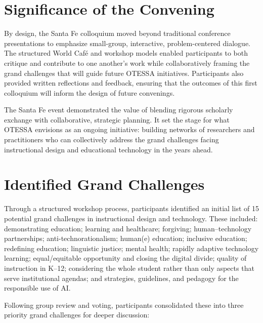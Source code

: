 \documentclass[
  letterpaper,
  DIV=11,
  numbers=noendperiod]{scrartcl}
\begin{document}
\section{Significance of the
Convening}\label{significance-of-the-convening}

By design, the Santa Fe colloquium moved beyond traditional conference
presentations to emphasize small-group, interactive, problem-centered
dialogue. The structured World Café and workshop models enabled
participants to both critique and contribute to one another's work while
collaboratively framing the grand challenges that will guide future
OTESSA initiatives. Participants also provided written reflections and
feedback, ensuring that the outcomes of this first colloquium will
inform the design of future convenings.

The Santa Fe event demonstrated the value of blending rigorous scholarly
exchange with collaborative, strategic planning. It set the stage for
what OTESSA envisions as an ongoing initiative: building networks of
researchers and practitioners who can collectively address the grand
challenges facing instructional design and educational technology in the
years ahead.

\section{Identified Grand Challenges}\label{identified-grand-challenges}

Through a structured workshop process, participants identified an
initial list of 15 potential grand challenges in instructional design
and technology. These included: demonstrating education; learning and
healthcare; forgiving; human--technology partnerships;
anti-technorationalism; human(e) education; inclusive education;
redefining education; linguistic justice; mental health; rapidly
adaptive technology learning; equal/equitable opportunity and closing
the digital divide; quality of instruction in K--12; considering the
whole student rather than only aspects that serve institutional agendas;
and strategies, guidelines, and pedagogy for the responsible use of AI.

Following group review and voting, participants consolidated these into
three priority grand challenges for deeper discussion:
\end{document}
